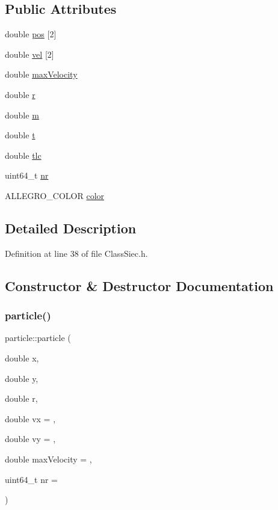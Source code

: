 \subsection*{Public Attributes}
\begin{DoxyCompactItemize}
\item 
double \mbox{\hyperlink{structparticle_a9ba2ff9e556c82ec96f56ce659c1ad50}{pos}} \mbox{[}2\mbox{]}
\item 
double \mbox{\hyperlink{structparticle_abd12470a54dcbf5694c6adeb8c06ef8b}{vel}} \mbox{[}2\mbox{]}
\item 
double \mbox{\hyperlink{structparticle_a2ea1a35ec678df5cc776dfd6bd377fad}{max\+Velocity}}
\item 
double \mbox{\hyperlink{structparticle_a9ba64d6fa0d4bda34688d54a05341b77}{r}}
\item 
double \mbox{\hyperlink{structparticle_a4cb4f184e6cd2b5dc0dc555d14f265dd}{m}}
\item 
double \mbox{\hyperlink{structparticle_a5225483b35b28edcf29be553a367a952}{t}}
\item 
double \mbox{\hyperlink{structparticle_a5ab99949ec29f5623413672b923ffa25}{tlc}}
\item 
uint64\+\_\+t \mbox{\hyperlink{structparticle_a055d478842e85c5f730fc75f16254852}{nr}}
\item 
A\+L\+L\+E\+G\+R\+O\+\_\+\+C\+O\+L\+OR \mbox{\hyperlink{structparticle_a7ea0e8707e7e91c3f298c5881bce4581}{color}}
\end{DoxyCompactItemize}


\subsection{Detailed Description}


Definition at line 38 of file Class\+Siec.\+h.



\subsection{Constructor \& Destructor Documentation}
\mbox{\label{structparticle_a747b2142fefd6da08d95d84b32d985c5}} 
\subsubsection{\texorpdfstring{particle()}{particle()}}
{\footnotesize\ttfamily particle\+::particle (\begin{DoxyParamCaption}\item[{double}]{x,  }\item[{double}]{y,  }\item[{double}]{r,  }\item[{double}]{vx = {},  }\item[{double}]{vy = {},  }\item[{double}]{max\+Velocity = {},  }\item[{uint64\+\_\+t}]{nr = {} }\end{DoxyParamCaption})}



